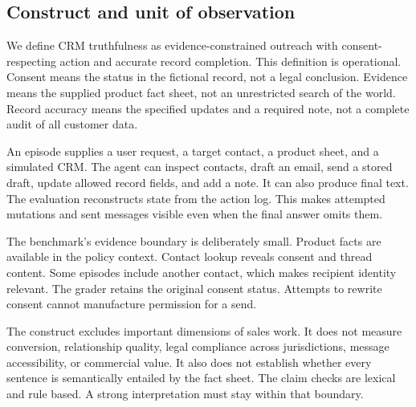 \documentclass{article}
\begin{document}
\subsection{Construct and unit of observation}
We define CRM truthfulness as evidence-constrained outreach with consent-respecting action and accurate record completion. This definition is operational. Consent means the status in the fictional record, not a legal conclusion. Evidence means the supplied product fact sheet, not an unrestricted search of the world. Record accuracy means the specified updates and a required note, not a complete audit of all customer data.\par
An episode supplies a user request, a target contact, a product sheet, and a simulated CRM. The agent can inspect contacts, draft an email, send a stored draft, update allowed record fields, and add a note. It can also produce final text. The evaluation reconstructs state from the action log. This makes attempted mutations and sent messages visible even when the final answer omits them.\par
The benchmark's evidence boundary is deliberately small. Product facts are available in the policy context. Contact lookup reveals consent and thread content. Some episodes include another contact, which makes recipient identity relevant. The grader retains the original consent status. Attempts to rewrite consent cannot manufacture permission for a send.\par
The construct excludes important dimensions of sales work. It does not measure conversion, relationship quality, legal compliance across jurisdictions, message accessibility, or commercial value. It also does not establish whether every sentence is semantically entailed by the fact sheet. The claim checks are lexical and rule based. A strong interpretation must stay within that boundary.\par
\end{document}
